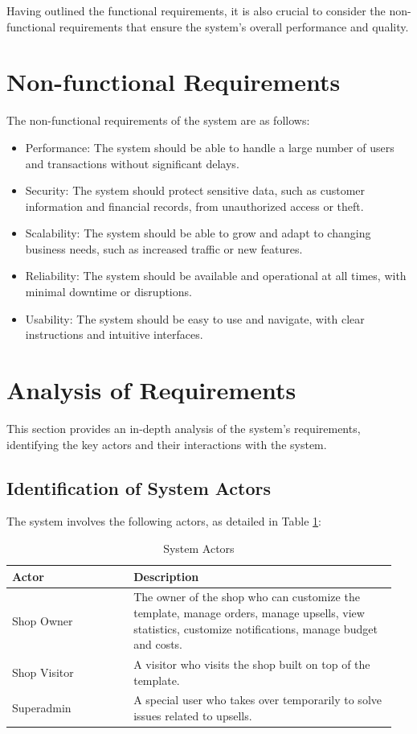 Having outlined the functional requirements, it is also crucial to consider the non-functional requirements that ensure the system's overall performance and quality.

\section{Non-functional Requirements}
The non-functional requirements of the system are as follows:
\begin{itemize}
    \item Performance: The system should be able to handle a large number of users and transactions without significant delays.
    \item Security: The system should protect sensitive data, such as customer information and financial records, from unauthorized access or theft.
    \item Scalability: The system should be able to grow and adapt to changing business needs, such as increased traffic or new features.
    \item Reliability: The system should be available and operational at all times, with minimal downtime or disruptions.
    \item Usability: The system should be easy to use and navigate, with clear instructions and intuitive interfaces.
\end{itemize}

\section{Analysis of Requirements}
This section provides an in-depth analysis of the system's requirements, identifying the key actors and their interactions with the system.

\subsection{Identification of System Actors}
The system involves the following actors, as detailed in Table \ref{tab:actors}:

\begin{table}[H] %
\centering
\begin{tabular}{|p{0.3\linewidth}|p{0.65\linewidth}|} %
\hline
\textbf{Actor} & \textbf{Description} \\
\hline
Shop Owner & The owner of the shop who can customize the template, manage orders, manage upsells, view statistics, customize notifications, manage budget and costs. \\
\hline
Shop Visitor & A visitor who visits the shop built on top of the template. \\
\hline
Superadmin & A special user who takes over temporarily to solve issues related to upsells. \\
\hline
\end{tabular}
\caption{System Actors}
\label{tab:actors}
\end{table}

